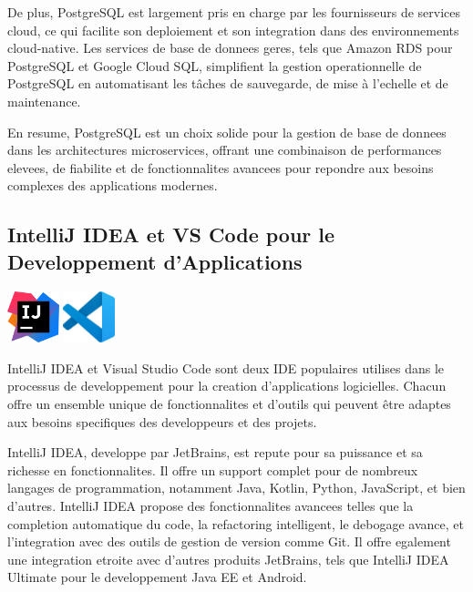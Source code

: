 \documentclass[a4paper, 11pt, openany]{report}
\begin{document}
De plus, PostgreSQL est largement pris en charge par les fournisseurs de services cloud, ce qui facilite son deploiement et son integration dans des environnements cloud-native. Les services de base de donnees geres, tels que Amazon RDS pour PostgreSQL et Google Cloud SQL, simplifient la gestion operationnelle de PostgreSQL en automatisant les tâches de sauvegarde, de mise à l'echelle et de maintenance.

En resume, PostgreSQL est un choix solide pour la gestion de base de donnees dans les architectures microservices, offrant une combinaison de performances elevees, de fiabilite et de fonctionnalites avancees pour repondre aux besoins complexes des applications modernes.



\subsection{IntelliJ IDEA et VS Code pour le Developpement d'Applications}
\begin{center}
\includegraphics[height=1.5cm]{intellij.png}
\includegraphics[height=1.5cm]{vscode.jpg}
\end{center}

IntelliJ IDEA et Visual Studio Code sont deux IDE populaires utilises dans le processus de developpement pour la creation d'applications logicielles. Chacun offre un ensemble unique de fonctionnalites et d'outils qui peuvent être adaptes aux besoins specifiques des developpeurs et des projets.

IntelliJ IDEA, developpe par JetBrains, est repute pour sa puissance et sa richesse en fonctionnalites. Il offre un support complet pour de nombreux langages de programmation, notamment Java, Kotlin, Python, JavaScript, et bien d'autres. IntelliJ IDEA propose des fonctionnalites avancees telles que la completion automatique du code, la refactoring intelligent, le debogage avance, et l'integration avec des outils de gestion de version comme Git. Il offre egalement une integration etroite avec d'autres produits JetBrains, tels que IntelliJ IDEA Ultimate pour le developpement Java EE et Android.
\end{document}
